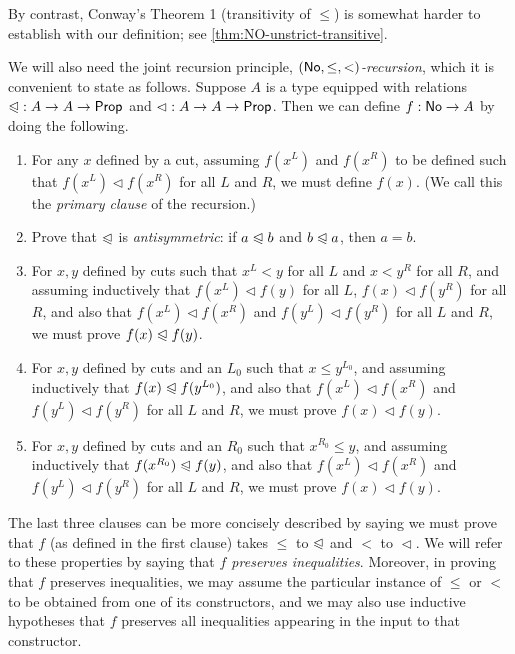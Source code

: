 By contrast, Conway's Theorem 1 (transitivity of $\le$) is somewhat harder to establish with our definition; see \autoref{thm:NO-unstrict-transitive}.




\newcommand{\ble}{\trianglelefteqslant}
\newcommand{\blt}{\vartriangleleft}
\newcommand{\bble}{\sqsubseteq}
\newcommand{\bblt}{\sqsubset}

We will also need the joint recursion principle, \emph{$(\mathsf{No},\le,<)$-recursion}, which it is convenient to state as follows.
Suppose $A$ is a type equipped with relations $\mathord\ble:A\to A\to\prop$ and $\mathord\blt:A\to A\to\prop$.
Then we can define $f:\mathsf{No}\to A$ by doing the following.
\begin{enumerate}
\item For any $x$ defined by a cut, assuming $f(x^L)$ and $f(x^R)$ to be defined such that $f(x^L)\blt f(x^R)$ for all $L$ and $R$, we must define $f(x)$.  (We call this the \emph{primary clause} of the recursion.)\label{item:NO-rec-primary}
\item Prove that $\ble$ is \emph{antisymmetric}: if $a\ble b$ and $b\ble a$, then $a=b$.
\item For $x,y$ defined by cuts such that $x^L<y$ for all $L$ and $x<y^R$ for all $R$, and assuming inductively that $f(x^L)\blt f(y)$ for all $L$, $f(x)\blt f(y^R)$ for all $R$, and also that $f(x^L)\blt f(x^R)$ and $f(y^L)\blt f(y^R)$ for all $L$ and $R$, we must prove $f(x)\ble f(y)$.
\item For $x,y$ defined by cuts and an $L_0$ such that $x\le y^{L_0}$, and assuming inductively that $f(x)\ble f(y^{L_0})$, and also that $f(x^L)\blt f(x^R)$ and $f(y^L)\blt f(y^R)$ for all $L$ and $R$, we must prove $f(x)\blt f(y)$.
\item For $x,y$ defined by cuts and an $R_0$ such that $x^{R_0}\le y$, and assuming inductively that $f(x^{R_0})\ble f(y)$, and also that $f(x^L)\blt f(x^R)$ and $f(y^L)\blt f(y^R)$ for all $L$ and $R$, we must prove $f(x)\blt f(y)$.\label{item:NO-rec-last}
\end{enumerate}
The last three clauses can be more concisely described by saying we must prove that $f$ (as defined in the first clause) takes $\le$ to $\ble$ and $<$ to $\blt$.
We will refer to these properties by saying that \emph{$f$ preserves inequalities}.
Moreover, in proving that $f$ preserves inequalities, we may assume the particular instance of $\le$ or $<$ to be obtained from one of its constructors, and we may also use inductive hypotheses that $f$ preserves all inequalities appearing in the input to that constructor.

